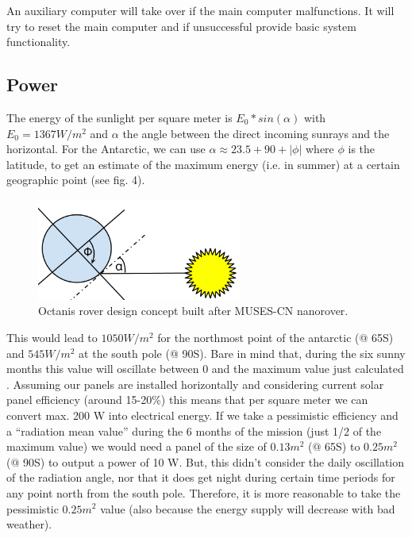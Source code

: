 \documentclass[a4paper,12pt]{article}
\begin{document}
An auxiliary computer will take over if the main computer malfunctions. It will try to reset the main computer and if unsuccessful provide basic system functionality.



\subsection{Power}

The energy of the sunlight per square meter is $E_0*sin(\alpha)$ with $E_0=1367 W/m^2$ \cite{solarc} and $\alpha$ the angle between the direct incoming sunrays and the horizontal. For the Antarctic, we can use $\alpha \approx 23.5+90+|\phi|$ where $\phi$ is the latitude, to get an estimate of the maximum energy (i.e. in summer) at a certain geographic point (see fig. 4).


\begin{figure}[h!]
	\centering
    \includegraphics[width=0.6\textwidth]{sun}
    \caption{Octanis rover design concept built after MUSES-CN nanorover.}
\end{figure}


 This would lead to $1050 W/m^2$ for the northmost point of the antarctic (@ 65\degree S) and $545 W/m^2$ at the south pole (@ 90\degree S). Bare in mind that, during the six sunny months this value will oscillate between 0 and the maximum value just calculated \cite{pvedu}. 
Assuming our panels are installed horizontally and considering current solar panel efficiency (around 15-20\%) this means that per square meter we can convert max. 200 W into electrical energy. If we take a pessimistic efficiency and a “radiation mean value” during the 6 months of the mission (just 1/2 of the maximum value) we would need a panel of the size of $0.13m^2$ (@ 65\degree S) to $0.25m^2$ (@ 90\degree S) to output a power of 10 W. But, this didn’t consider the daily oscillation of the radiation angle, nor that it does get night during certain time periods for any point north from the south pole. Therefore, it is more reasonable to take the pessimistic $0.25m^2$ value (also because the energy supply will decrease with bad weather).
\end{document}
